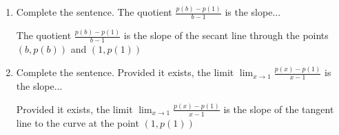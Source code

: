 \documentclass[nooutcomes]{ximera}
\begin{document}
\begin{problem}
\begin{enumerate}
\begin{freeResponse}
		\end{freeResponse}

		\item Complete the sentence.  The quotient $\frac{p(b)-p(1)}{b-1}$ is the slope...

		\begin{freeResponse}
			The quotient $\frac{p(b)-p(1)}{b-1}$ is the slope of the secant line through the points $(b,p(b))$ and $(1,p(1))$
		\end{freeResponse}

		\item Complete the sentence.  Provided it exists, the limit $\lim_{x \to 1}\frac{p(x)-p(1)}{x-1}$ is the slope...
		\begin{freeResponse}
			 Provided it exists, the limit $\lim_{x \to 1}\frac{p(x)-p(1)}{x-1}$ is the slope of the tangent line to the curve at the point $(1,p(1))$
		\end{freeResponse}
	\end{enumerate}
\end{problem}
\end{document}
